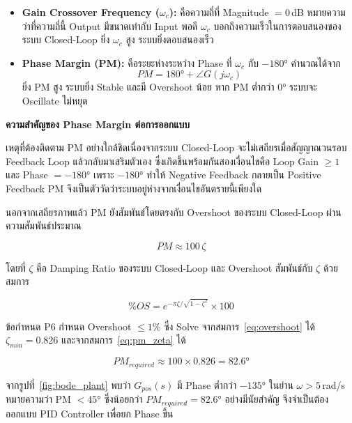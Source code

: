\begin{itemize}
  \item \textbf{Gain Crossover Frequency ($\omega_c$):} คือความถี่ที่ 
        Magnitude $= 0$\,dB หมายความว่าที่ความถี่นี้ Output มีขนาดเท่ากับ 
        Input พอดี $\omega_c$ บอกถึงความเร็วในการตอบสนองของระบบ 
        Closed-Loop ยิ่ง $\omega_c$ สูง ระบบยิ่งตอบสนองเร็ว

  \item \textbf{Phase Margin (PM):} คือระยะห่างระหว่าง Phase ที่ $\omega_c$ 
        กับ $-180°$ คำนวณได้จาก
        \begin{equation}
          PM = 180° + \angle G(j\omega_c)
          \label{eq:phase_margin}
        \end{equation}
        ยิ่ง PM สูง ระบบยิ่ง Stable และมี Overshoot น้อย 
        หาก PM ต่ำกว่า $0°$ ระบบจะ Oscillate ไม่หยุด
\end{itemize}

\textbf{ความสำคัญของ Phase Margin ต่อการออกแบบ}

เหตุที่ต้องติดตาม PM อย่างใกล้ชิดเนื่องจากระบบ Closed-Loop
จะไม่เสถียรเมื่อสัญญาณวนรอบ Feedback Loop แล้วกลับมาเสริมตัวเอง
ซึ่งเกิดขึ้นพร้อมกันสองเงื่อนไขคือ Loop Gain $\geq 1$ และ Phase $= -180°$
เพราะ $-180°$ ทำให้ Negative Feedback กลายเป็น Positive Feedback
PM จึงเป็นตัววัดว่าระบบอยู่ห่างจากเงื่อนไขอันตรายนี้เพียงใด

นอกจากเสถียรภาพแล้ว PM ยังสัมพันธ์โดยตรงกับ Overshoot
ของระบบ Closed-Loop ผ่านความสัมพันธ์ประมาณ

\begin{equation}
  PM \approx 100\,\zeta
  \label{eq:pm_zeta}
\end{equation}

โดยที่ $\zeta$ คือ Damping Ratio ของระบบ Closed-Loop
และ Overshoot สัมพันธ์กับ $\zeta$ ด้วยสมการ

\begin{equation}
  \%OS = e^{-\pi\zeta/\sqrt{1-\zeta^2}} \times 100
  \label{eq:overshoot}
\end{equation}

ข้อกำหนด P6 กำหนด Overshoot $\leq 1\%$ ซึ่ง Solve จากสมการ~\eqref{eq:overshoot}
ได้ $\zeta_{min} = 0.826$ และจากสมการ~\eqref{eq:pm_zeta} ได้

\begin{equation}
  PM_{required} \approx 100 \times 0.826 = 82.6°
  \label{eq:pm_required}
\end{equation}

จากรูปที่~\ref{fig:bode_plant} พบว่า $G_{pos}(s)$ มี Phase 
ต่ำกว่า $-135°$ ในย่าน $\omega > 5$\,rad/s หมายความว่า 
PM $< 45°$ ซึ่งน้อยกว่า $PM_{required} = 82.6°$ อย่างมีนัยสำคัญ
จึงจำเป็นต้องออกแบบ PID Controller เพื่อยก Phase ขึ้น

